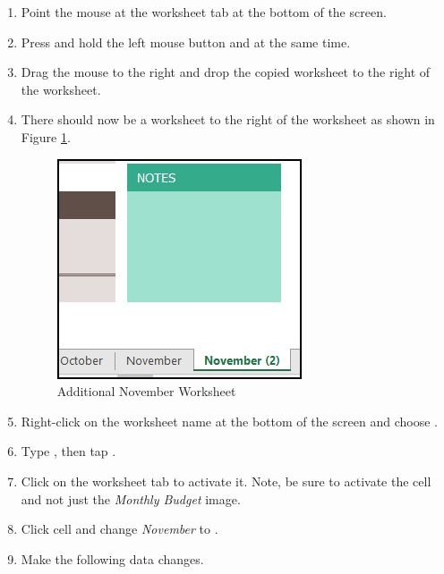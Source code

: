 \begin{enumbox}
	\begin{enumerate}
		\item Point the mouse at the  worksheet tab at the bottom of the screen.
		\item Press and hold the left mouse button and  at the same time. 
		\item Drag the mouse to the right and drop the copied worksheet to the right of the  worksheet.
		\item There should now be a  worksheet to the right of the  worksheet as shown in Figure \ref{06:fig02}.

		\begin{figure}[H]
			\centering
			\includegraphics[width=\maxwidth{.50\linewidth}]{gfx/ch06_fig02}
			\caption{Additional November Worksheet}
			\label{06:fig02}
		\end{figure}

		\item Right-click on the  worksheet name at the bottom of the screen and choose .
		\item Type , then tap .
		\item Click on the  worksheet tab to activate it. Note, be sure to activate the cell and not just the \textit{Monthly Budget} image.
		\item Click cell  and change \textit{November} to .
		\item Make the following data changes.
	

\end{enumerate}
\end{enumbox}
